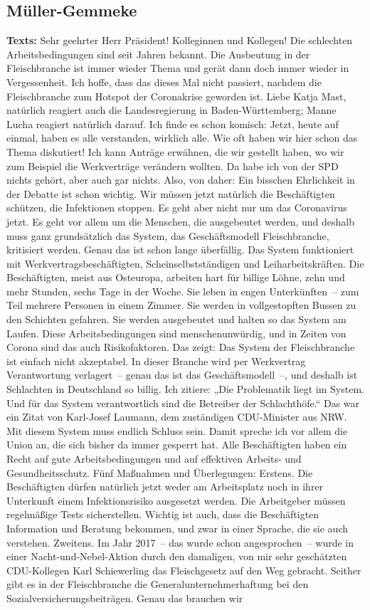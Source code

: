 \documentclass{article}
\begin{document}
\subsection{Müller-Gemmeke}
\noindent\textbf{Texts:} Sehr geehrter Herr Präsident! Kolleginnen und Kollegen! Die schlechten Arbeitsbedingungen sind seit Jahren bekannt. Die Ausbeutung in der Fleischbranche ist immer wieder Thema und gerät dann doch immer wieder in Vergessenheit. Ich hoffe, dass das dieses Mal nicht passiert, nachdem die Fleischbranche zum Hotspot der Coronakrise geworden ist. Liebe Katja Mast, natürlich reagiert auch die Landesregierung in Baden-Württemberg; Manne Lucha reagiert natürlich darauf. Ich finde es schon komisch: Jetzt, heute auf einmal, haben es alle verstanden, wirklich alle. Wie oft haben wir hier schon das Thema diskutiert! Ich kann Anträge erwähnen, die wir gestellt haben,  wo wir zum Beispiel die Werkverträge verändern wollten. Da habe ich von der SPD nichts gehört, aber auch gar nichts. Also, von daher: Ein bisschen Ehrlichkeit in der Debatte ist schon wichtig.  Wir müssen jetzt natürlich die Beschäftigten schützen, die Infektionen stoppen. Es geht aber nicht nur um das Coronavirus jetzt. Es geht vor allem um die Menschen, die ausgebeutet werden, und deshalb muss ganz grundsätzlich das System, das Geschäftsmodell Fleischbranche, kritisiert werden. Genau das ist schon lange überfällig.  Das System funktioniert mit Werkvertragsbeschäftigten, Scheinselbstständigen und Leiharbeitskräften. Die Beschäftigten, meist aus Osteuropa, arbeiten hart für billige Löhne, zehn und mehr Stunden, sechs Tage in der Woche. Sie leben in engen Unterkünften – zum Teil mehrere Personen in einem Zimmer. Sie werden in vollgestopften Bussen zu den Schichten gefahren. Sie werden ausgebeutet und halten so das System am Laufen. Diese Arbeitsbedingungen sind menschenunwürdig, und in Zeiten von Corona sind das auch Risikofaktoren. Das zeigt: Das System der Fleischbranche ist einfach nicht akzeptabel.  In dieser Branche wird per Werkvertrag Verantwortung verlagert – genau das ist das Geschäftsmodell –, und deshalb ist Schlachten in Deutschland so billig. Ich zitiere: „Die Problematik liegt im System. Und für das System verantwortlich sind die Betreiber der Schlachthöfe.“ Das war ein Zitat von Karl-Josef Laumann, dem zuständigen CDU-Minister aus NRW. Mit diesem System muss endlich Schluss sein. Damit spreche ich vor allem die Union an,  die sich bisher da immer gesperrt hat. Alle Beschäftigten haben ein Recht auf gute Arbeitsbedingungen und auf effektiven Arbeits- und Gesundheitsschutz.  Fünf Maßnahmen und Überlegungen: Erstens. Die Beschäftigten dürfen natürlich jetzt weder am Arbeitsplatz noch in ihrer Unterkunft einem Infektionsrisiko ausgesetzt werden. Die Arbeitgeber müssen regelmäßige Tests sicherstellen. Wichtig ist auch, dass die Beschäftigten Information und Beratung bekommen, und zwar in einer Sprache, die sie auch verstehen.  Zweitens. Im Jahr 2017 – das wurde schon angesprochen – wurde in einer Nacht-und-Nebel-Aktion durch den damaligen, von mir sehr geschätzten CDU-Kollegen Karl Schiewerling das Fleischgesetz auf den Weg gebracht. Seither gibt es in der Fleischbranche die Generalunternehmerhaftung bei den Sozialversicherungsbeiträgen. Genau das brauchen wir 
\end{document}
